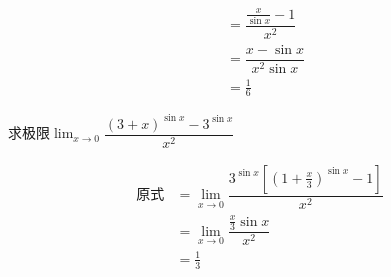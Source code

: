\documentclass[8pt a4paper, oneside, UTF8]{ctexbook}
\begin{document}
\begin{sloppypar}
\begin{solution}
\begin{align*}
                      & = \dfrac{\frac{x}{\sin x}-1}{x^2}                   \\
                      & = \dfrac{x-\sin x}{x^2\sin x}                       \\
                      & = \frac{1}{6}
        \end{align*}
    \end{solution}
    \begin{problem}
    求极限$\lim_{x\to 0}\dfrac{(3+x)^{\sin x} -3^{\sin x}}{x^2}$
    \end{problem}
    \begin{solution}
        \begin{align*}
            \text{原式} & = \lim_{x\to 0} \dfrac{3^{\sin x}[(1+\frac{x}{3})^{\sin x} -1]}{x^2} \\
                      & =  \lim_{x\to 0}\dfrac{\frac{x}{3}\sin x}{x^2}                       \\
                      & = \frac{1}{3}
        \end{align*}
    \end{solution}

\end{sloppypar}
\end{document}
